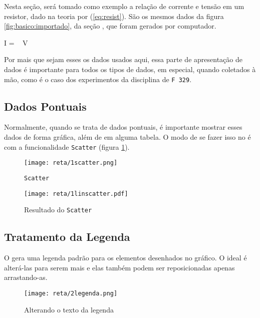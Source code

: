 Nesta seção, será tomado como exemplo a relação de corrente e tensão em um resistor, dado na teoria por (\ref{eq:resist}). São os mesmos dados da figura \ref{fig:basico:importado}, da seção , que foram gerados por computador.

\begin{equacao} \label{eq:resist}
    I =  ~ V
\end{equacao}

Por mais que sejam esses os dados usados aqui, essa parte de apresentação de dados é importante para todos os tipos de dados, em especial, quando coletados à mão, como é o caso dos experimentos da disciplina de \texttt{F 329}.


\subsection{Dados Pontuais}

    Normalmente, quando se trata de dados pontuais, é importante mostrar esses dados de forma gráfica, além de em alguma tabela. O modo de se fazer isso no \software é com a funcionalidade \texttt{Scatter} (figura \ref{fig:reta:scatter}).

    \begin{figure}[htbp]
        \centering
        \texttt{[image: reta/1scatter.png]}

        \caption{\texttt{Scatter}}
        \label{fig:reta:scatter}
    \end{figure}

    \begin{figure}[htbp]
        \centering
        \texttt{[image: reta/1linscatter.pdf]}

        \caption{Resultado do \texttt{Scatter}}
        \label{fig:reta:linscatter}
    \end{figure}


\subsection{Tratamento da Legenda}

    O \software gera uma legenda padrão para os elementos desenhados no gráfico. O ideal é alterá-las para serem mais e elas também podem ser reposicionadas apenas arrastando-as.

    \begin{figure}[htbp]
        \centering
        \texttt{[image: reta/2legenda.png]}

        \caption{Alterando o texto da legenda}
        \label{fig:reta:logenda}
    \end{figure}


